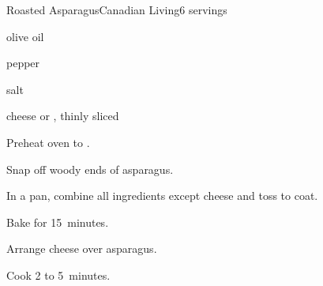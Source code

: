 \begin{recipe}{Roasted Asparagus}{Canadian Living}{6 servings}

\begin{ingredients}
\item {} 
\item {} olive oil
\item \tp{\half} pepper
\item \tp{\quarter} salt
\item {}  cheese or , thinly sliced
\end{ingredients}

\begin{directions}
\item Preheat oven to .
\item Snap off woody ends of asparagus.
\item In a pan, combine all ingredients except cheese and toss to coat.
\item Bake for 15~minutes.
\item Arrange cheese over asparagus.
\item Cook 2 to 5~minutes.  
\end{directions}

\end{recipe}
